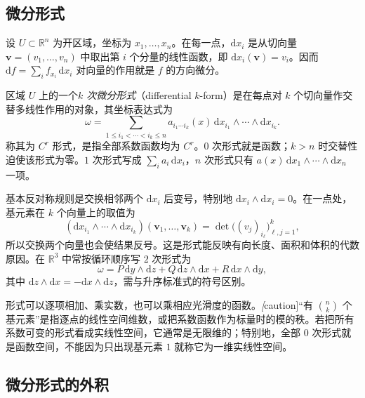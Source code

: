 \subsection{微分形式}
\label{subsec:differential-forms}

设 $U\subset\mathbb R^n$ 为开区域，坐标为 $x_1,\ldots,x_n$。在每一点，$\mathrm dx_i$ 是从切向量 $\boldsymbol v=(v_1,\ldots,v_n)$ 中取出第 $i$ 个分量的线性函数，即 $\mathrm dx_i(\boldsymbol v)=v_i$。因而 $\mathrm df=\sum_i f_{x_i}\,\mathrm dx_i$ 对向量的作用就是 $f$ 的方向微分。

\begin{definition}
\label{def:differential-k-form}
区域 $U$ 上的一个\emph{$k$ 次微分形式}（differential $k$-form）是在每点对 $k$ 个切向量作交替多线性作用的对象，其坐标表达式为
\begin{equation}
\label{eq:differential-form-standard}
    \omega=\sum_{1\leq i_1<\cdots<i_k\leq n}
    a_{i_1\cdots i_k}(x)\,
    \mathrm dx_{i_1}\wedge\cdots\wedge\mathrm dx_{i_k}.
\end{equation}
称其为 $C^r$ 形式，是指全部系数函数均为 $C^r$。$0$ 次形式就是函数；$k>n$ 时交替性迫使该形式为零。$1$ 次形式写成 $\sum_i a_i\,\mathrm dx_i$，$n$ 次形式只有 $a(x)\,\mathrm dx_1\wedge\cdots\wedge\mathrm dx_n$ 一项。
\end{definition}

基本反对称规则是交换相邻两个 $\mathrm dx_i$ 后变号，特别地 $\mathrm dx_i\wedge\mathrm dx_i=0$。在一点处，基元素在 $k$ 个向量上的取值为
\[
    (\mathrm dx_{i_1}\wedge\cdots\wedge\mathrm dx_{i_k})
    (\boldsymbol v_1,\ldots,\boldsymbol v_k)
    =\det\bigl((v_j)_{i_\ell}\bigr)_{\ell,j=1}^k,
\]
所以交换两个向量也会使结果反号。这是形式能反映有向长度、面积和体积的代数原因。在 $\mathbb R^3$ 中常按循环顺序写 $2$ 次形式为
\[
    \omega=P\,\mathrm dy\wedge\mathrm dz+Q\,\mathrm dz\wedge\mathrm dx
           +R\,\mathrm dx\wedge\mathrm dy,
\]
其中 $\mathrm dz\wedge\mathrm dx=-\mathrm dx\wedge\mathrm dz$，需与升序标准式的符号区别。

形式可以逐项相加、乘实数，也可以乘相应光滑度的函数。\emph[caution]{“有 $\binom nk$ 个基元素”是指逐点的线性空间维数，或把系数函数作为标量时的模的秩。}若把所有系数可变的形式看成实线性空间，它通常是无限维的；特别地，全部 $0$ 次形式就是函数空间，不能因为只出现基元素 $1$ 就称它为一维实线性空间。

\subsection{微分形式的外积}
\label{subsec:exterior-products-of-differential-forms}


